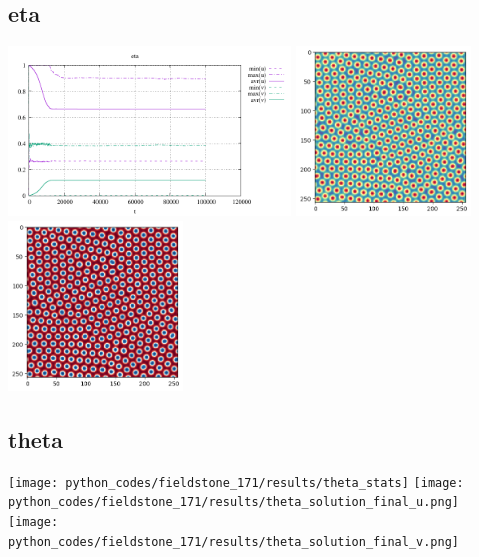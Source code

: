 \subsection*{eta}
\begin{center}
\includegraphics[height=4.5cm]{python_codes/fieldstone_171/results/eta_stats}
\includegraphics[height=4.5cm]{python_codes/fieldstone_171/results/eta_solution_final_u.png}
\includegraphics[height=4.5cm]{python_codes/fieldstone_171/results/eta_solution_final_v.png}
\end{center}

\subsection*{theta}
\begin{center}
\texttt{[image: python\_codes/fieldstone\_171/results/theta\_stats]}
\texttt{[image: python\_codes/fieldstone\_171/results/theta\_solution\_final\_u.png]}
\texttt{[image: python\_codes/fieldstone\_171/results/theta\_solution\_final\_v.png]}
\end{center}

